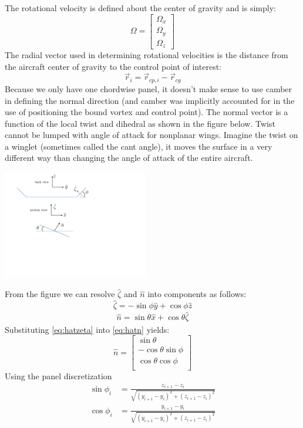 \documentclass{article}
\begin{document}
The rotational velocity is defined about the center of gravity and is simply:
\begin{equation}
    \Omega =
    \begin{bmatrix}
    \Omega_x\\ \Omega_y\\ \Omega_z
    \end{bmatrix}
\end{equation}
The radial vector used in determining rotational velocities is the distance from the aircraft center of gravity to the control point of interest:
\begin{equation}
\vec{r}_i = \vec r_{cp, i} - \vec r_{cg}
\end{equation}
Because we only have one chordwise panel, it doesn't make sense to use camber in defining the normal direction (and camber was implicitly accounted for in the use of positioning the bound vortex and control point).  The normal vector is a function of the local twist and dihedral as shown in the figure below.  Twist cannot be lumped with angle of attack for nonplanar wings.  Imagine the twist on a winglet (sometimes called the cant angle), it moves  the surface in a very different way than changing the angle of attack of the entire aircraft.
\begin{center}
\includegraphics[width=2.5in]{figs/normalvector}
\end{center}
From the figure we can resolve $\hat\zeta$ and $\hat{n}$ into components as follows:
\begin{equation}
\hat\zeta = -\sin\phi \hat{y} + \cos\phi \hat{z}
\label{eq:hatzeta}
\end{equation}
\begin{align}
\hat{n} = \sin\theta \hat{x} + \cos\theta \hat{\zeta}
\label{eq:hatn}
\end{align}
Substituting \cref{eq:hatzeta} into \cref{eq:hatn} yields:
\begin{equation}
    \hat{n} =
    \begin{bmatrix}
        \sin\theta\\
        -\cos\theta\sin\phi\\
        \cos\theta\cos\phi\\
    \end{bmatrix}
\end{equation}
Using the panel discretization
\begin{align}
    \sin\phi_i &= \frac{z_{i+1} - z_i}{\sqrt{(y_{i+1} - y_i)^2 + (z_{i+1} - z_i)^2}}\\
    \cos\phi_i &= \frac{y_{i+1} - y_i}{\sqrt{(y_{i+1} - y_i)^2 + (z_{i+1} - z_i)^2}}
\end{align}
\end{document}
